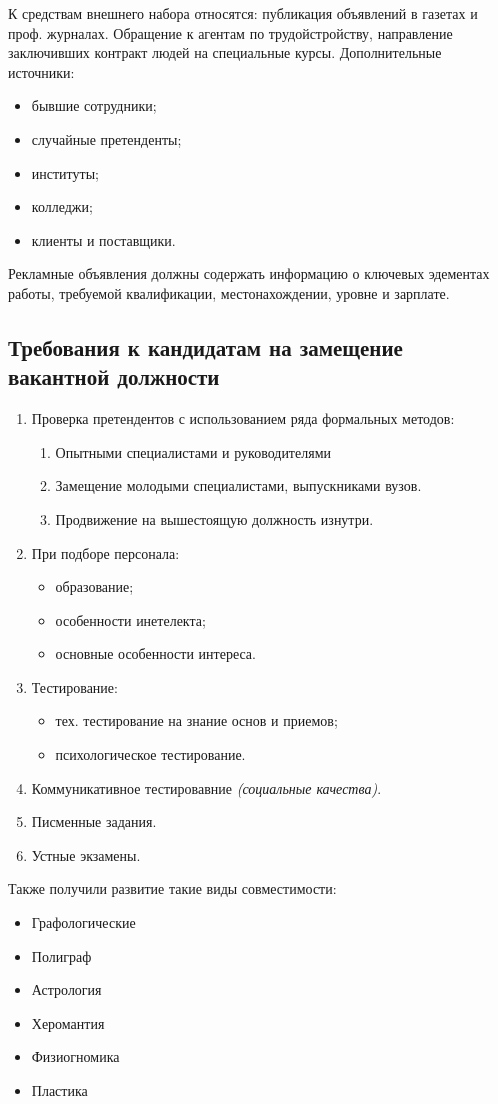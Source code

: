 \documentclass[a4paper,12pt,oneside,final]{extarticle}
\numberwithin{equation}{section}
\begin{document}
К средствам внешнего набора относятся: публикация объявлений в газетах и проф. журналах. 
Обращение к агентам по трудойстройству, направление заключивших контракт людей на специальные курсы. 
Дополнительные источники: 
\begin{itemize}
	\item бывшие сотрудники;
	\item случайные претенденты;
	\item институты;
	\item колледжи;
	\item клиенты и поставщики.
\end{itemize} 
Рекламные объявления должны содержать информацию о ключевых эдементах работы, требуемой квалификации, местонахождении, уровне и зарплате.

\subsection{Требования к кандидатам на замещение вакантной должности}
\begin{enumerate}
	\item Проверка претендентов с использованием ряда формальных методов:
	\begin{enumerate}
		\item Опытными специалистами и руководителями 
		\item Замещение молодыми специалистами, выпускниками вузов.
		\item Продвижение на вышестоящую должность изнутри.
	\end{enumerate}
	\item При подборе персонала:
	\begin{itemize}
		\item образование;
		\item особенности инетелекта;
		\item основные особенности интереса.
	\end{itemize}
	\item Тестирование:
	\begin{itemize}
		\item тех. тестирование на знание основ и приемов;
		\item психологическое тестирование.
	\end{itemize}
	\item Коммуникативное тестировавние \textit{(социальные качества)}.
	\item Писменные задания.
	\item Устные экзамены.
\end{enumerate}
Также получили развитие такие виды совместимости:
\begin{itemize}
	\item Графологические
	\item Полиграф
	\item Астрология
	\item Херомантия
	\item Физиогномика
	\item Пластика
\end{itemize}
\end{document}
